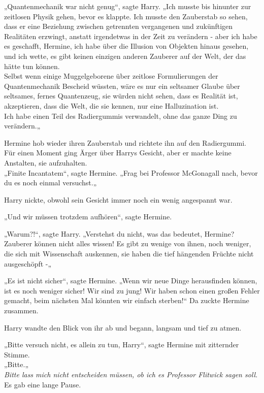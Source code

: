 {„Quantenmechanik war nicht genug“, sagte Harry. „Ich musste bis hinunter zur zeitlosen Physik gehen, bevor es klappte. Ich musste den Zauberstab so sehen, dass er eine Beziehung zwischen getrennten vergangenen und zukünftigen Realitäten erzwingt, anstatt irgendetwas in der Zeit zu verändern - aber ich habe es geschafft, Hermine, ich habe über die Illusion von Objekten hinaus gesehen, und ich wette, es gibt keinen einzigen anderen Zauberer auf der Welt, der das hätte tun können.\\ Selbst wenn einige Muggelgeborene über zeitlose Formulierungen der Quantenmechanik Bescheid wüssten, wäre es nur ein seltsamer Glaube über seltsames, fernes Quantenzeug, sie würden nicht sehen, dass es Realität ist, akzeptieren, dass die Welt, die sie kennen, nur eine Halluzination ist.\\ Ich habe einen Teil des Radiergummis verwandelt, ohne das ganze Ding zu verändern.„

Hermine hob wieder ihren Zauberstab und richtete ihn auf den Radiergummi.\\ Für einen Moment ging Ärger über Harrys Gesicht, aber er machte keine Anstalten, sie aufzuhalten.\\ „Finite Incantatem“, sagte Hermine. „Frag bei Professor McGonagall nach, bevor du es noch einmal versuchst.„

Harry nickte, obwohl sein Gesicht immer noch ein wenig angespannt war.

„Und wir müssen trotzdem aufhören“, sagte Hermine.

„Warum?!“, sagte Harry. „Verstehst du nicht, was das bedeutet, Hermine? Zauberer können nicht alles wissen! Es gibt zu wenige von ihnen, noch weniger, die sich mit Wissenschaft auskennen, sie haben die tief hängenden Früchte nicht ausgeschöpft -„

„Es ist nicht sicher“, sagte Hermine. „Wenn wir neue Dinge herausfinden können, ist es noch weniger sicher! Wir sind zu jung! Wir haben schon einen großen Fehler gemacht, beim nächsten Mal könnten wir einfach sterben!“ Da zuckte Hermine zusammen.

Harry wandte den Blick von ihr ab und begann, langsam und tief zu atmen.

„Bitte versuch nicht, es allein zu tun, Harry“, sagte Hermine mit zitternder Stimme.\\ „Bitte.„\\ \emph{Bitte lass mich nicht entscheiden müssen, ob ich es Professor Flitwick sagen soll}.\\ Es gab eine lange Pause.

}
